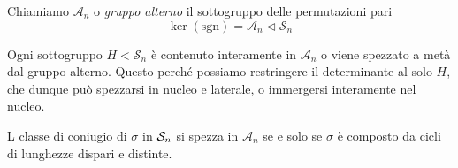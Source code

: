 \begin{multicols}{2}
\begin{definition}
	Chiamiamo $ \mathcal{A}_n $ o \emph{gruppo alterno} il sottogruppo delle permutazioni pari
	\[ \ker(\text{sgn}) = \mathcal{A}_n \lhd \mathcal{S}_n \]
\end{definition}
\begin{remark}
	Ogni sottogruppo $ H < \mathcal{S}_n $ è contenuto interamente in $ \mathcal{A}_n $ o viene spezzato a metà dal gruppo alterno. Questo perché possiamo restringere il determinante al solo $ H $, che dunque può spezzarsi in nucleo e laterale, o immergersi interamente nel nucleo.
\end{remark}

\begin{prop}[si spezzamento]
	L classe di coniugio di $ \sigma $ in $ \S_n $ si spezza in $ \mathcal{A}_n $ se e solo se $ \sigma $ è composto da cicli di lunghezze dispari e distinte.
\end{prop}





\end{multicols}
